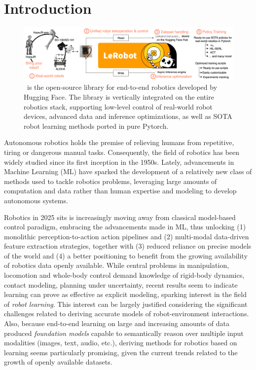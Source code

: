\section{Introduction}

\begin{figure}
    \centering
    \includegraphics[width=\linewidth]{figures/ch1/ch1-lerobot-figure1.png}
    \caption{\lerobot \ is the open-source library for end-to-end robotics developed by Hugging Face. The library is vertically integrated on the entire robotics stack, supporting low-level control of real-world robot devices, advanced data and inference optimizations, as well as  SOTA robot learning methods ported in pure Pytorch.}
    \label{fig:figure1}
\end{figure}

Autonomous robotics holds the premise of relieving humans from repetitive, tiring or dangerous manual tasks. 
Consequently, the field of robotics has been widely studied since its first inception in the 1950s.
Lately, advancements in Machine Learning (ML) have sparked the development of a relatively new class of methods used to tackle robotics problems, leveraging large amounts of computation and data rather than human expertise and modeling to develop autonomous systems.

Robotics in 2025 sits is increasingly moving away from classical model-based control paradigm, embracing the advancements made in ML, thus unlocking (1) monolithic perception-to-action action pipelines and (2) multi-modal data-driven feature extraction strategies, together with (3) reduced reliance on precise models of the world and (4) a better positioning to benefit from the growing availability of robotics data openly available.
While central problems in manipulation, locomotion and whole-body control demand knowledge of rigid-body dynamics, contact modeling, planning under uncertainty, recent results seem to indicate learning can prove as effective as explicit modeling, sparking interest in the field of \emph{robot learning}.
This interest can be largely justified considering the significant challenges related to deriving accurate models of robot-environment interactions.
Also, because end-to-end learning on large and increasing amounts of data produced \emph{foundation models} capable to semantically reason over multiple input modalities (images, text, audio, etc.), deriving methods for robotics based on learning seems particularly promising, given the current trends related to the growth of openly available datasets.


